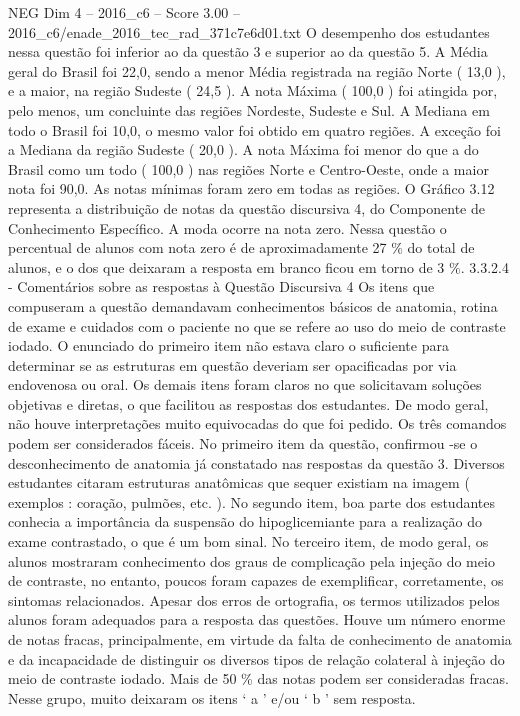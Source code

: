 \begin{textsample}{NEG Dim 4 – 2016\_c6 – Score 3.00 – 2016\_c6/enade\_2016\_tec\_rad\_371c7e6d01.txt}
O desempenho dos estudantes nessa questão foi inferior ao da questão 3 e superior ao da questão 5.
A Média geral do Brasil foi 22,0, sendo a menor Média registrada na região Norte ( 13,0 ), e a maior, na região Sudeste ( 24,5 ).
A nota Máxima ( 100,0 ) foi atingida por, pelo menos, um concluinte das regiões Nordeste, Sudeste e Sul.
A Mediana em todo o Brasil foi 10,0, o mesmo valor foi obtido em quatro regiões.
A exceção foi a Mediana da região Sudeste ( 20,0 ).
A nota Máxima foi menor do que a do Brasil como um todo ( 100,0 ) nas regiões Norte e Centro-Oeste, onde a maior nota foi 90,0.
As notas mínimas foram zero em todas as regiões.
O Gráfico 3.12 representa a distribuição de notas da questão discursiva 4, do Componente de Conhecimento Específico.
A moda ocorre na nota zero.
Nessa questão o percentual de alunos com nota zero é de aproximadamente 27 \% do total de alunos, e o dos que deixaram a resposta em branco ficou em torno de 3 \%. 3.3.2.4 - Comentários sobre as respostas à Questão Discursiva 4 Os itens que compuseram a questão demandavam conhecimentos básicos de anatomia, rotina de exame e cuidados com o paciente no que se refere ao uso do meio de contraste iodado.
O enunciado do primeiro item não estava claro o suficiente para determinar se as estruturas em questão deveriam ser opacificadas por via endovenosa ou oral.
Os demais itens foram claros no que solicitavam soluções objetivas e diretas, o que facilitou as respostas dos estudantes.
De modo geral, não houve interpretações muito equivocadas do que foi pedido.
Os três comandos podem ser considerados fáceis.
No primeiro item da questão, confirmou -se o desconhecimento de anatomia já constatado nas respostas da questão 3.
Diversos estudantes citaram estruturas anatômicas que sequer existiam na imagem ( exemplos : coração, pulmões, etc. ).
No segundo item, boa parte dos estudantes conhecia a importância da suspensão do hipoglicemiante para a realização do exame contrastado, o que é um bom sinal.
No terceiro item, de modo geral, os alunos mostraram conhecimento dos graus de complicação pela injeção do meio de contraste, no entanto, poucos foram capazes de exemplificar, corretamente, os sintomas relacionados.
Apesar dos erros de ortografia, os termos utilizados pelos alunos foram adequados para a resposta das questões.
Houve um número enorme de notas fracas, principalmente, em virtude da falta de conhecimento de anatomia e da incapacidade de distinguir os diversos tipos de relação colateral à injeção do meio de contraste iodado.
Mais de 50 \% das notas podem ser consideradas fracas.
Nesse grupo, muito deixaram os itens ‘ a ’ e/ou ‘ b ’ sem resposta.

\end{textsample}
